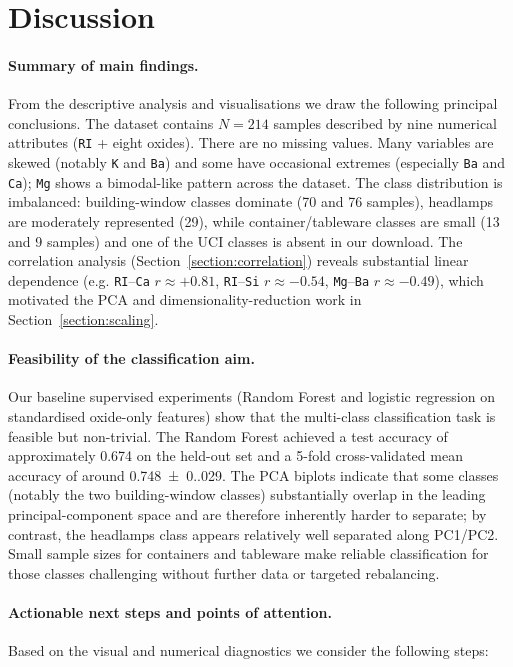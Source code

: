 \documentclass[dtu]{dtuarticle}
\begin{document}
	\section{Discussion}
	\paragraph{Summary of main findings.}
	From the descriptive analysis and visualisations we draw the following principal conclusions. The dataset
	contains $N=214$ samples described by nine numerical attributes (\texttt{RI} + eight oxides). There are no
	missing values. Many variables are skewed (notably \texttt{K} and \texttt{Ba}) and some have occasional extremes
	(especially \texttt{Ba} and \texttt{Ca}); \texttt{Mg} shows a bimodal-like pattern across the dataset. The class distribution is
	imbalanced: building-window classes dominate (70 and 76 samples), headlamps are moderately represented
	(29), while container/tableware classes are small (13 and 9 samples) and one of the UCI classes is
	absent in our download. The correlation analysis (Section~\ref{section:correlation}) reveals substantial
	linear dependence (e.g. \texttt{RI}--\texttt{Ca} $r\approx +0.81$, \texttt{RI}--\texttt{Si} $r\approx -0.54$, \texttt{Mg}--\texttt{Ba} $r\approx -0.49$),
	which motivated the PCA and dimensionality-reduction work in Section~\ref{section:scaling}.

	\paragraph{Feasibility of the classification aim.}
	Our baseline supervised experiments (Random Forest and logistic regression on standardised oxide-only
	features) show that the multi-class classification task is feasible but non-trivial. The Random Forest
	achieved a test accuracy of approximately 0.674 on the held-out set and a 5-fold cross-validated
	mean accuracy of around \SI{0.748(0.029)}{}. The PCA biplots
	indicate that some classes (notably the two building-window classes) substantially overlap in the
	leading principal-component space and are therefore inherently harder to separate; by contrast, the
	headlamps class appears relatively well separated along PC1/PC2. Small sample sizes for containers and
	tableware make reliable classification for those classes challenging without further data or targeted
	rebalancing.

	\paragraph{Actionable next steps and points of attention.}
	Based on the visual and numerical diagnostics we consider the following steps:
\end{document}
